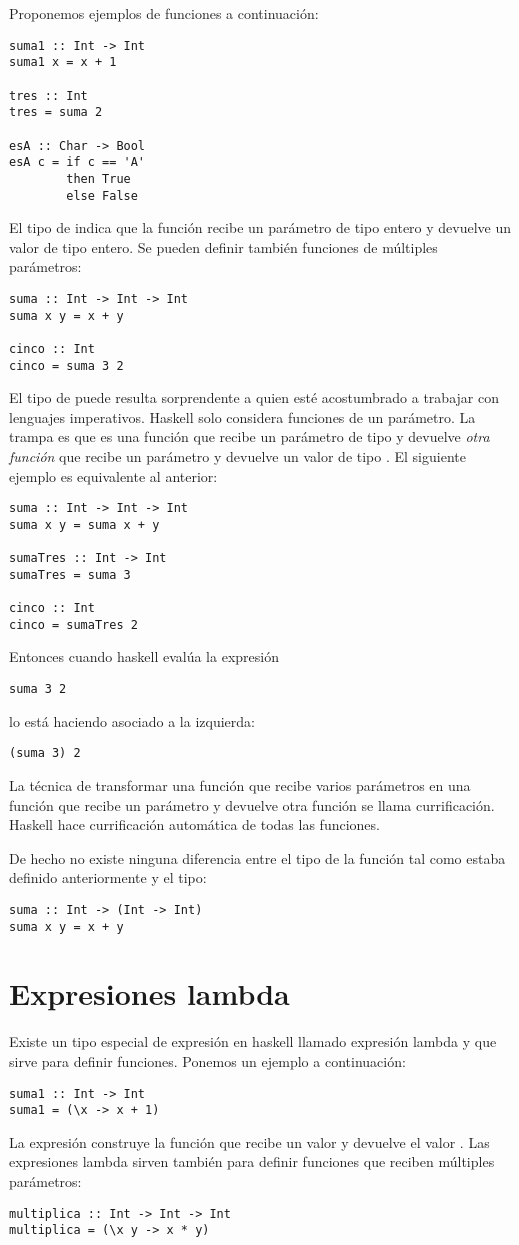 Proponemos ejemplos de funciones a continuación:
\begin{verbatim}
suma1 :: Int -> Int
suma1 x = x + 1

tres :: Int
tres = suma 2

esA :: Char -> Bool
esA c = if c == 'A'
        then True
        else False
\end{verbatim}
El tipo de  indica que la función recibe un parámetro
de tipo entero y devuelve un valor de tipo entero. Se pueden
definir también funciones de múltiples parámetros:
\begin{verbatim}
suma :: Int -> Int -> Int
suma x y = x + y

cinco :: Int
cinco = suma 3 2
\end{verbatim}
El tipo de  puede resulta sorprendente
a quien esté acostumbrado a trabajar con lenguajes imperativos.
Haskell solo considera funciones de un parámetro. La trampa es que
 es una función que recibe un parámetro de tipo 
y devuelve \emph{otra función} que recibe un parámetro 
y devuelve un valor de tipo . El siguiente ejemplo es
equivalente al anterior:
\begin{verbatim}
suma :: Int -> Int -> Int
suma x y = suma x + y

sumaTres :: Int -> Int
sumaTres = suma 3

cinco :: Int
cinco = sumaTres 2
\end{verbatim}
Entonces cuando haskell evalúa la expresión
\begin{verbatim}
suma 3 2
\end{verbatim}
lo está haciendo asociado a la izquierda:
\begin{verbatim}
(suma 3) 2
\end{verbatim}
La técnica de transformar una función que recibe varios parámetros
en una función que recibe un parámetro y devuelve otra función
se llama currificación. Haskell hace currificación automática
de todas las funciones.

De hecho no existe ninguna diferencia entre el tipo de la función
 tal como estaba definido anteriormente y el tipo:
\begin{verbatim}
suma :: Int -> (Int -> Int)
suma x y = x + y
\end{verbatim}

\section{Expresiones lambda}
Existe un tipo especial de expresión en haskell llamado expresión
lambda y que sirve para definir funciones. Ponemos un ejemplo
a continuación:
\begin{verbatim}
suma1 :: Int -> Int
suma1 = (\x -> x + 1)
\end{verbatim}
La expresión construye la función que recibe un valor 
y devuelve el valor . Las expresiones lambda sirven
también para definir funciones que reciben múltiples parámetros:
\begin{verbatim}
multiplica :: Int -> Int -> Int
multiplica = (\x y -> x * y)
\end{verbatim}

